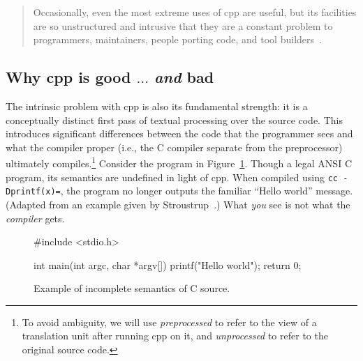 \documentclass{article}
\newcommand{\Cpp}{\mbox{\textsf{cpp}}}
\newcommand{\C}{\mbox{\textsf{C}}}
\newcommand{\ie}{i.e.,}
\newcommand{\figref}[1]{Figure~\ref{#1}}
\begin{document}
\begin{quotation}
\noindent Occasionally, even the most extreme uses of \Cpp{} are useful, but its
facilities are so unstructured and intrusive that they are a constant
problem to programmers, maintainers, people porting code, and tool
builders~\cite[p.~424]{Stroustrup94}.
\end{quotation}

\subsection{Why \Cpp{} is good $\ldots$ \emph{and} bad}

The intrinsic problem with \Cpp{} is also its fundamental strength: it
is a conceptually distinct first pass of textual processing over the
source code.  This introduces significant differences between the code that the
programmer sees and what the compiler proper (\ie{} the \C{} compiler
separate from the preprocessor) ultimately compiles.\footnote{To avoid
  ambiguity, we will use \emph{preprocessed} to refer to the view of a
  translation unit after running \Cpp{} on it, and \emph{unprocessed} to
  refer to the original source code.} Consider the program in
\figref{fig:badmain}.  Though a legal ANSI \C{} program, its semantics are
undefined in light of \Cpp{}.  When compiled using \texttt{cc
  -Dprintf(x)=}, the program no longer outputs the familiar ``Hello
world'' message. (Adapted from an example given by
  Stroustrup~\cite[p.~423]{Stroustrup94}.)  What \emph{you} see is not
what the \emph{compiler} gets.


\begin{figure}[hbtp]
\begin{center}
\begin{small}
\begin{pseudocode}[3in]
#include <stdio.h>

int main(int argc, char *argv[]) {
  printf("Hello world");
  return 0;
}
\end{pseudocode}
\end{small}
\caption{Example of incomplete semantics of \C{} source.}
\label{fig:badmain}
\end{center}
\end{figure}
\end{document}
